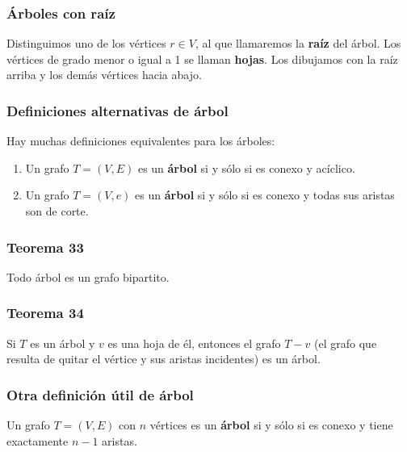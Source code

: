 \begin{multicols}{2}
    \subsubsection*{Árboles con raíz}
    Distinguimos uno de los vértices $r \in V$, al que llamaremos la \textbf{raíz} del árbol. Los vértices de grado menor o igual a 1 se llaman \textbf{hojas}. Los dibujamos con la raíz arriba y los demás vértices hacia abajo.
    
    \subsubsection*{Definiciones alternativas de árbol}
    Hay muchas definiciones equivalentes para los árboles:
    \begin{enumerate}
        \item Un grafo $T = (V, E)$ es un \textbf{árbol} si y sólo si es conexo y acíclico.
        \item Un grafo $T = (V, e)$ es un \textbf{árbol} si y sólo si es conexo y todas sus aristas son de corte.
    \end{enumerate}
    
    \subsubsection*{Teorema 33}
    Todo árbol es un grafo bipartito.
    
    \subsubsection*{Teorema 34}
    Si $T$ es un árbol y $v$ es una hoja de él, entonces el grafo $T - v$ (el grafo que resulta de quitar el vértice y sus aristas incidentes) es un árbol.
    
    \subsubsection*{Otra definición útil de árbol}
    Un grafo $T = (V, E)$ con $n$ vértices es un \textbf{árbol} si y sólo si es conexo y tiene exactamente $n - 1$ aristas.
    

\end{multicols}

